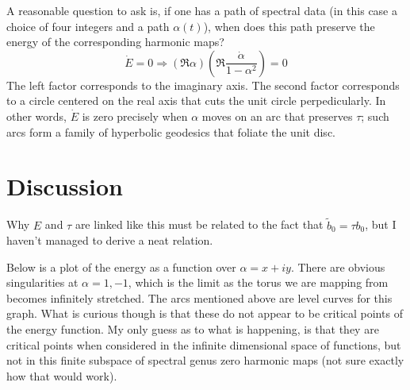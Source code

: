 \documentclass{article}
\begin{document}
A reasonable question to ask is, if one has a path of spectral data (in this case a choice of four integers and a path $\alpha(t)$), when does this path preserve the energy of the corresponding harmonic maps?
\[
\dot E = 0 \Rightarrow \left(\Re \alpha\right)\left( \Re \frac{\dot \alpha}{1-\alpha^2} \right) = 0
\]
The left factor corresponds to the imaginary axis. The second factor corresponds to a circle centered on the real axis that cuts the unit circle perpedicularly. In other words, $\dot E$ is zero precisely when $\alpha$ moves on an arc that preserves $\tau$; such arcs form a family of hyperbolic geodesics that foliate the unit disc.

\section*{Discussion}
Why $E$ and $\tau$ are linked like this must be related to the fact that $\tilde b_0 = \tau b_0$, but I haven't managed to derive a neat relation.

Below is a plot of the energy as a function over $\alpha = x + i y$. There are obvious singularities at $\alpha=1,-1$, which is the limit as the torus we are mapping from becomes infinitely stretched. The arcs mentioned above are level curves for this graph. What is curious though is that these do not appear to be critical points of the energy function. My only guess as to what is happening, is that they are critical points when considered in the infinite dimensional space of functions, but not in this finite subspace of spectral genus zero harmonic maps (not sure exactly how that would work).

\begin{center}
\end{center}
\end{document}
